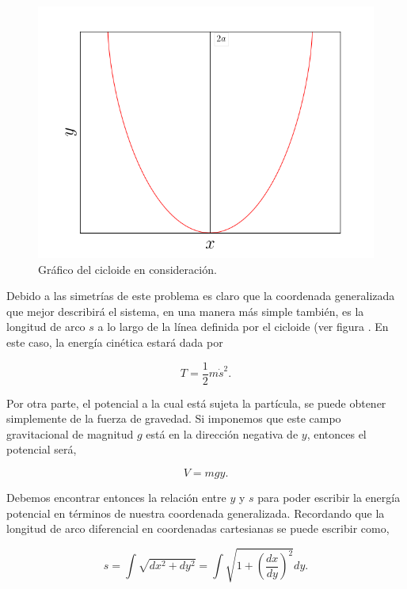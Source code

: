 \documentclass[a4paper,10pt]{article}
\numberwithin{equation}{section}
\begin{document}
\begin{figure}[H]
 \center
 \includegraphics[scale=0.4]{problema5fig1}
 \caption{Gráfico del cicloide en consideración.}
 \label{fig:problema5fig1}
\end{figure}

Debido a las simetrías de este problema es claro que la coordenada generalizada que 
mejor describirá el sistema, en una manera más simple también, es la longitud de 
arco $s$ a lo largo de la línea definida por el cicloide (ver figura . 
En este caso, la energía cinética estará dada por 

\begin{equation}
 T = \frac{1}{2} m \dot{s}^2.
 \label{eq:energCinetCiclo1}
\end{equation}

Por otra parte, el potencial a la cual está sujeta la partícula, se puede obtener
simplemente de la fuerza de gravedad. Si imponemos que este campo gravitacional de 
magnitud $g$ está en la dirección negativa de $y$, entonces el potencial será,

\begin{equation}
 V = mgy.
 \label{eq:energPotenCiclo1}
\end{equation}

Debemos encontrar entonces la relación entre $y$ y $s$ para poder escribir la energía 
potencial en términos de nuestra coordenada generalizada. Recordando que la longitud 
de arco diferencial en coordenadas cartesianas se puede escribir como,

\begin{equation}
 s = \int \sqrt{dx^2+dy^2} = \int \sqrt{1+\left( \frac{dx}{dy} \right)^2} dy.
 \label{eq:arcoCartesiano}
\end{equation}
\end{document}
